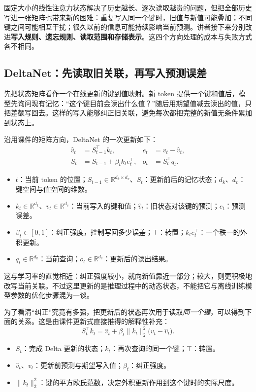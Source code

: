 \documentclass[11pt,a4paper]{article}
\begin{document}
固定大小的线性注意力状态解决了历史越长、逐次读取越贵的问题，但把全部历史写进一张矩阵也带来新的困难：重复写入同一个键时，旧值与新值可能叠加；不同键之间可能相互干扰；很久以前的信息可能持续影响当前预测。讲者接下来分别改进\textbf{写入规则、遗忘规则、读取范围和存储表示}。这四个方向处理的成本与失败方式各不相同。

\subsection{DeltaNet：先读取旧关联，再写入预测误差}

先把状态矩阵看作一个在线更新的键到值映射。新 token 提供一个键和值后，模型先询问现有记忆：“这个键目前会读出什么值？”随后用期望值减去读出的值，只把差额写回去。这样的写入能够纠正旧关联，避免每次都把完整的新值无条件累加到状态上。

沿用课件的矩阵方向，DeltaNet 的一次更新如下：
$$
\begin{aligned}
\widehat v_t &= S_{t-1}^{\top}k_t, & e_t &= v_t-\widehat v_t,\\
S_t &= S_{t-1}+\beta_t k_t e_t^{\top}, & o_t &= S_t^{\top}q_t.
\end{aligned}
$$
\begin{itemize}
  \item $t$：当前 token 的位置；$S_{t-1}\in\mathbb R^{d_k\times d_v}$、$S_t$：更新前后的记忆状态；$d_k$、$d_v$：键空间与值空间的维数。
  \item $k_t\in\mathbb R^{d_k}$、$v_t\in\mathbb R^{d_v}$：当前写入的键和值；$\widehat v_t$：旧状态对该键的预测；$e_t$：预测误差。
  \item $\beta_t\in[0,1]$：纠正强度，控制写回多少误差；$\top$：转置；$k_t e_t^{\top}$：一个秩一的外积更新。
  \item $q_t\in\mathbb R^{d_k}$：当前查询；$o_t\in\mathbb R^{d_v}$：更新后的读出结果。
\end{itemize}

这与学习率的直觉相近：纠正强度较小，就向新值靠近一部分；较大，则更积极地改写当前关联。不过这里更新的是推理过程中的动态状态，不能把它与离线训练模型参数的优化步骤混为一谈。

为了看清“纠正”究竟有多强，把更新后的状态再次用于读取\emph{同一个键}，可以得到下面的关系。这是由课件更新式直接推得的解释性补充：
$$
S_t^{\top}k_t
=\widehat v_t+\beta_t\lVert k_t\rVert_2^2\bigl(v_t-\widehat v_t\bigr).
$$
\begin{itemize}
  \item $S_t$：完成 Delta 更新的状态；$k_t$：再次查询的同一个键；$\top$：转置。
  \item $\widehat v_t$、$v_t$：更新前预测与期望写入值；$\beta_t$：纠正强度。
  \item $\lVert k_t\rVert_2^2$：键的平方欧氏范数，决定外积更新作用到这个键时的实际尺度。
\end{itemize}
\end{document}

